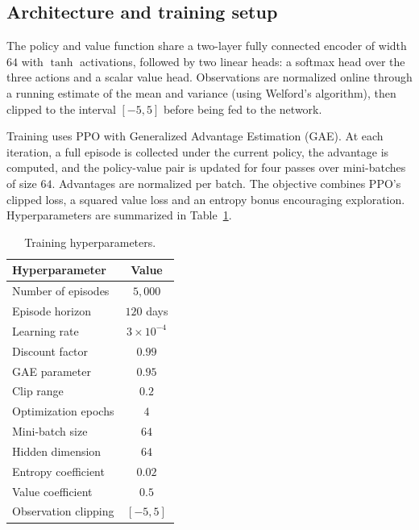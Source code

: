 \subsection{Architecture and training setup}
\label{subsec:training}

The policy and value function share a two-layer fully connected encoder of width $64$ with $\tanh$ activations, followed by two linear heads: a softmax head over the three actions and a scalar value head. Observations are normalized online through a running estimate of the mean and variance (using Welford's algorithm), then clipped to the interval $[-5, 5]$ before being fed to the network.

Training uses PPO with Generalized Advantage Estimation (GAE). At each iteration, a full episode is collected under the current policy, the advantage is computed, and the policy-value pair is updated for four passes over mini-batches of size $64$. Advantages are normalized per batch. The objective combines PPO's clipped loss, a squared value loss and an entropy bonus encouraging exploration. Hyperparameters are summarized in Table~\ref{tab:hparams}.

\begin{table}[h]
\centering
\begin{tabular}{lc}
\toprule
Hyperparameter & Value \\
\midrule
Number of episodes            & $5{,}000$ \\
Episode horizon               & $120$ days \\
Learning rate                 & $3 \times 10^{-4}$ \\
Discount factor               & $0.99$ \\
GAE parameter                 & $0.95$ \\
Clip range                    & $0.2$ \\
Optimization epochs           & $4$ \\
Mini-batch size               & $64$ \\
Hidden dimension              & $64$ \\
Entropy coefficient           & $0.02$ \\
Value coefficient             & $0.5$ \\
Observation clipping          & $[-5, 5]$ \\
\bottomrule
\end{tabular}
\caption{Training hyperparameters.}
\label{tab:hparams}
\end{table}


